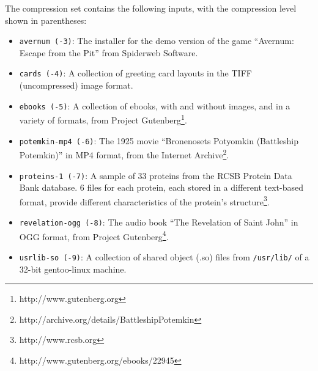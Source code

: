 The compression set contains the following inputs, with the compression level shown in parentheses:
\begin{itemize}

\item {\tt avernum (-3)}: The installer for the demo version of the game  ``Avernum: Escape from the Pit'' from Spiderweb Software.

\item {\tt cards (-4)}: A collection of greeting card layouts in the TIFF (uncompressed) image format.

\item {\tt ebooks (-5)}: A collection of ebooks, with and without images, and in a variety of formats, from Project Gutenberg\footnote{http://www.gutenberg.org}.

\item {\tt potemkin-mp4 (-6)}: The 1925 movie ``Bronenosets Potyomkin (Battleship Potemkin)'' in MP4 format, from the Internet Archive\footnote{http://archive.org/details/BattleshipPotemkin}.

\item {\tt proteins-1 (-7)}: A sample of 33 proteins from the RCSB Protein Data Bank database.  6 files for each protein, each stored in a different text-based format, provide different characteristics of the protein's structure\footnote{http://www.rcsb.org}.

\item {\tt revelation-ogg (-8)}: The audio book ``The Revelation of Saint John'' in OGG format, from Project Gutenberg\footnote{http://www.gutenberg.org/ebooks/22945}.

\item {\tt usrlib-so (-9)}: A collection of shared object (.so) files from {\tt /usr/lib/} of a 32-bit gentoo-linux machine.

\end{itemize}

